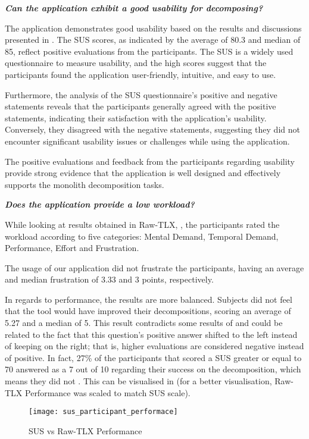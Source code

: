 \textbf{\emph{Can the application exhibit a good usability for decomposing?}}

The application demonstrates good usability based on the results and
discussions presented in . The SUS scores, as indicated by the
average of 80.3 and median of 85, reflect positive evaluations from the
participants. The SUS is a widely used questionnaire to measure usability, and
the high scores suggest that the participants found the application
user-friendly, intuitive, and easy to use.

Furthermore, the analysis of the SUS questionnaire's positive and negative
statements reveals that the participants generally agreed with the positive
statements, indicating their satisfaction with the application's usability.
Conversely, they disagreed with the negative statements, suggesting they did
not encounter significant usability issues or challenges while using the
application.

The positive evaluations and feedback from the participants regarding usability
provide strong evidence that the application is well designed and effectively
supports the monolith decomposition tasks.

\textbf{\emph{Does the application provide a low workload?}}

While looking at results obtained in Raw-TLX, , the
participants rated the workload according to five categories: Mental Demand,
Temporal Demand, Performance, Effort and Frustration.

The usage of our application did not frustrate the participants, having an
average and median frustration of 3.33 and 3 points, respectively.

In regards to performance, the results are more balanced. Subjects did not feel
that the tool would have improved their decompositions, scoring an average of
5.27 and a median of 5. This result contradicts some results of 
and could be related to the fact that this question's positive answer shifted
to the left instead of keeping on the right; that is, higher evaluations are
considered negative instead of positive. In fact, 27\% of the participants that
scored a SUS greater or equal to 70 answered as a 7 out of 10 regarding their
success on the decomposition, which means they did not . This can be visualised
in  (for a better visualisation, Raw-TLX
Performance was scaled to match SUS scale).

\begin{figure*}[!htb]
  \centering
  \texttt{[image: sus\_participant\_performace]}
  \caption{SUS vs Raw-TLX Performance}
  \label{fig:sus_participant_performance}
\end{figure*}

